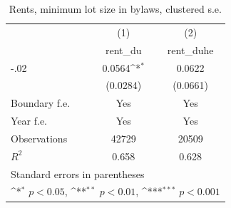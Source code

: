 \begin{table}[htbp]\centering
\def\sym#1{\ifmmode^{#1}\else\(^{#1}\)\fi}
\caption{Rents, minimum lot size in bylaws, clustered s.e.}
\begin{tabular}{l*{2}{c}}
\hline\hline
                    &\multicolumn{1}{c}{(1)}&\multicolumn{1}{c}{(2)}\\
                    &\multicolumn{1}{c}{rent\_du}&\multicolumn{1}{c}{rent\_duhe}\\
\hline
-.02                &      0.0564\sym{*}  &      0.0622         \\
                    &    (0.0284)         &    (0.0661)         \\
[1em]
Boundary f.e.       &         Yes         &         Yes         \\
[1em]
Year f.e.           &         Yes         &         Yes         \\
\hline
Observations        &       42729         &       20509         \\
\(R^{2}\)           &       0.658         &       0.628         \\
\hline\hline
\multicolumn{3}{l}{\footnotesize Standard errors in parentheses}\\
\multicolumn{3}{l}{\footnotesize \sym{*} \(p<0.05\), \sym{**} \(p<0.01\), \sym{***} \(p<0.001\)}\\
\end{tabular}
\end{table}
